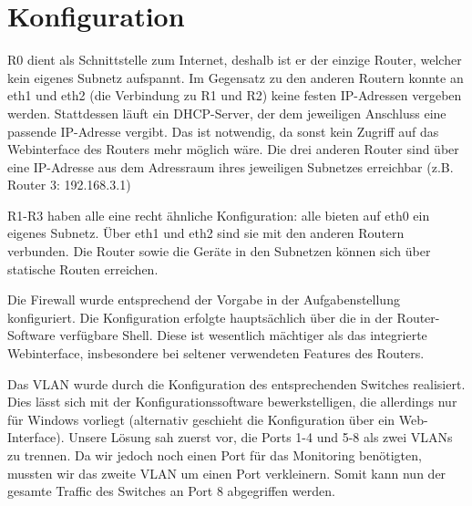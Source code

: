 \documentclass[11pt,a4paper]{article}
\begin{document}
\section{Konfiguration}
R0 dient als Schnittstelle zum Internet, deshalb ist er der
einzige Router, welcher kein eigenes Subnetz aufspannt. Im Gegensatz zu
den anderen Routern konnte an eth1 und eth2 (die Verbindung zu R1 und
R2) keine festen IP-Adressen vergeben werden. Stattdessen läuft ein
DHCP-Server, der dem jeweiligen Anschluss eine passende IP-Adresse
vergibt. Das ist notwendig, da sonst kein Zugriff auf das Webinterface
des Routers mehr möglich wäre. Die drei anderen Router sind über eine
IP-Adresse aus dem Adressraum ihres jeweiligen Subnetzes erreichbar
(z.B. Router 3: 192.168.3.1) \par

R1-R3 haben alle eine recht ähnliche Konfiguration: alle bieten
auf eth0 ein eigenes Subnetz. Über eth1 und eth2 sind sie mit den
anderen Routern verbunden. Die Router sowie die Geräte in den
Subnetzen können sich über statische Routen erreichen.
\par

Die Firewall wurde entsprechend der Vorgabe in der Aufgabenstellung
konfiguriert. Die Konfiguration erfolgte hauptsächlich über die in der
Router-Software verfügbare Shell. Diese ist wesentlich mächtiger als
das integrierte Webinterface, insbesondere bei seltener verwendeten
Features des Routers.
\par

Das VLAN wurde durch die Konfiguration des entsprechenden Switches
realisiert. Dies lässt sich mit der Konfigurationssoftware
bewerkstelligen, die allerdings nur für Windows vorliegt (alternativ
geschieht die Konfiguration über ein Web-Interface). Unsere Lösung sah
zuerst vor, die Ports 1-4 und 5-8 als zwei VLANs zu trennen. Da wir
jedoch noch einen Port für das Monitoring benötigten, mussten wir das
zweite VLAN um einen Port verkleinern. Somit kann nun der gesamte
Traffic des Switches an Port 8 abgegriffen werden. \par
\end{document}
